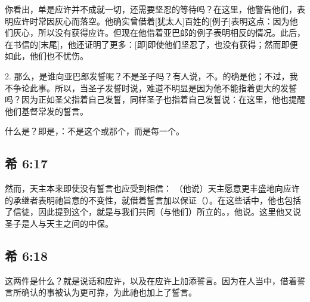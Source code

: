 你看出，单是应许并不成就一切，还需要坚忍的等待吗？在这里，他警告他们，表明应许时常因灰心而落空。他确实曾借着[犹太人]百姓的[例子]表明这点：因为他们灰心，所以没有获得应许。但现在他借着亚巴郎的例子表明相反的情况。此后，在书信的[末尾]，他还证明了更多：[即]即使他们坚忍了，也没有获得；然而即便如此，他们也不忧伤。\par

2. 那么，是谁向亚巴郎发誓呢？不是圣子吗？有人说，不。的确是他；不过，我不争论此事。所以，当圣子发誓时说，难道不明显是因为他不能指着更大的发誓吗？因为正如圣父指着自己发誓，同样圣子也指着自己发誓说：在这里，他也提醒他们基督常发的誓言。\par

什么是？即是，：不是这个或那个，而是每一个。\par


\subsection{希 6:17}

然而，天主本来即使没有誓言也应受到相信： （他说）天主愿意更丰盛地向应许的承继者表明祂旨意的不变性，就借着誓言加以保证（）。在这些话中，他也包括了信徒，因此提到这个，就是与我们共同（与他们）所立的。，他说。这里他又说圣子是人与天主之间的中保。\par


\subsection{希 6:18}

 这两件是什么？就是说话和应许，以及在应许上加添誓言。因为在人当中，借着誓言所确认的事被认为更可靠，为此祂也加上了誓言。\par

